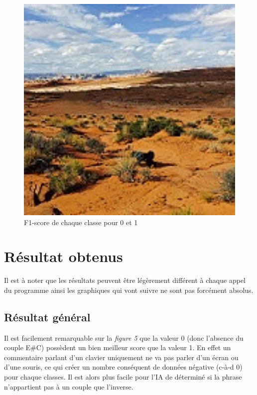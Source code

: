 \documentclass[12pt ,a4paper ]{article}
\begin{document}
\begin{multicols}{2}
\begin{figure}[t]
    \begin{center}
        \includegraphics[width=1.15\textwidth]{3808.jpg}
    \end{center}
    \caption{F1-score de chaque classe pour 0 et 1}
\end{figure}
\newpage
\section{Résultat obtenus}
Il est à noter que les résultats peuvent être légèrement différent à chaque appel du programme ainsi les graphiques qui vont suivre ne sont pas forcément absolus. 

\subsection{Résultat général}
Il est facilement remarquable sur la \textit{figure 5} que la valeur 0 (donc l'absence du couple E\#C) possèdent un bien meilleur score que la valeur 1. En effet un commentaire parlant d'un clavier uniquement ne va pas parler d'un écran ou d'une souris, ce qui créer un nombre conséquent de données négative (c-à-d 0) pour chaque classes. Il est alors plus facile pour l'IA de déterminé si la phrase n'appartient pas à un couple que l'inverse.\\


\end{multicols}
\end{document}
